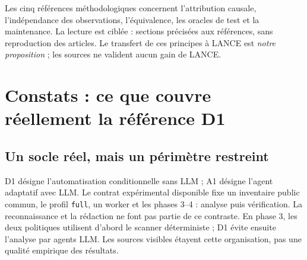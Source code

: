 \documentclass[11pt,a4paper]{article}
\begin{document}
Les cinq références méthodologiques concernent l'attribution causale,
l'indépendance des observations, l'équivalence, les oracles de test et la
maintenance. La lecture est ciblée : sections précisées aux références,
sans reproduction des articles. Le transfert de ces principes à LANCE est
\emph{notre proposition} ; les sources ne valident aucun gain de LANCE.

\section{Constats : ce que couvre réellement la référence D1}
\subsection{Un socle réel, mais un périmètre restreint}
D1 désigne l'automatisation conditionnelle sans LLM ; A1 désigne l'agent
adaptatif avec LLM. Le contrat expérimental disponible fixe un inventaire
public commun, le profil \texttt{full}, un worker et les phases 3--4 : analyse
puis vérification. La reconnaissance et la rédaction ne font pas partie de
ce contraste. En phase 3, les deux politiques utilisent d'abord le scanner
déterministe ; D1 évite ensuite l'analyse par agents LLM. Les sources visibles
étayent cette organisation, pas une qualité empirique des résultats.
\end{document}
